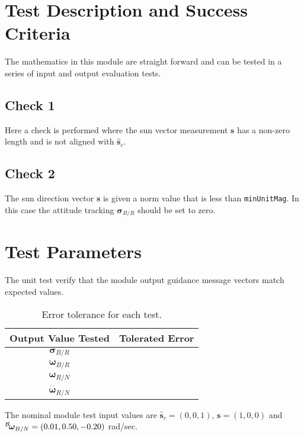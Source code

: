 
\section{Test Description and Success Criteria}
The mathematics in this module are straight forward and can be tested in a series of input and output evaluation tests.


\subsection{Check 1}
Here a check is performed where the sun vector measurement $\bm s$ has a non-zero length and is not aligned with $\hat{\bm s}_{c}$.  

\subsection{Check 2}
The sun direction vector $\bm s$ is given a norm value that is less than {\tt minUnitMag}.  In this case the attitude tracking $\bm\sigma_{B/R}$ should be set to zero.



\section{Test Parameters}
The unit test verify that the module output guidance message vectors match expected values.
\begin{table}[htbp]
	\caption{Error tolerance for each test.}
	\label{tab:errortol}
	\centering \fontsize{10}{10}\selectfont
	\begin{tabular}{ c | c } %
		\hline\hline
		\textbf{Output Value Tested}  & \textbf{Tolerated Error}  \\ 
		\hline
		$\bm\sigma_{B/R}$        & 	   \\ 
		$\bm\omega_{B/R}$        & \\ 
		$\bm\omega_{R/N}$        &  \\ 
		$\dot{\bm\omega}_{R/N}$        &   \\ 
		\hline\hline
	\end{tabular}
\end{table}

The nominal module test input values are $\hat{\bm s}_{c} = (0,0,1)$, $\bm s = (1,0,0)$ and $\leftexp{B}{\bm\omega}_{B/N} = (0.01, 0.50, -0.20)$ rad/sec.  



